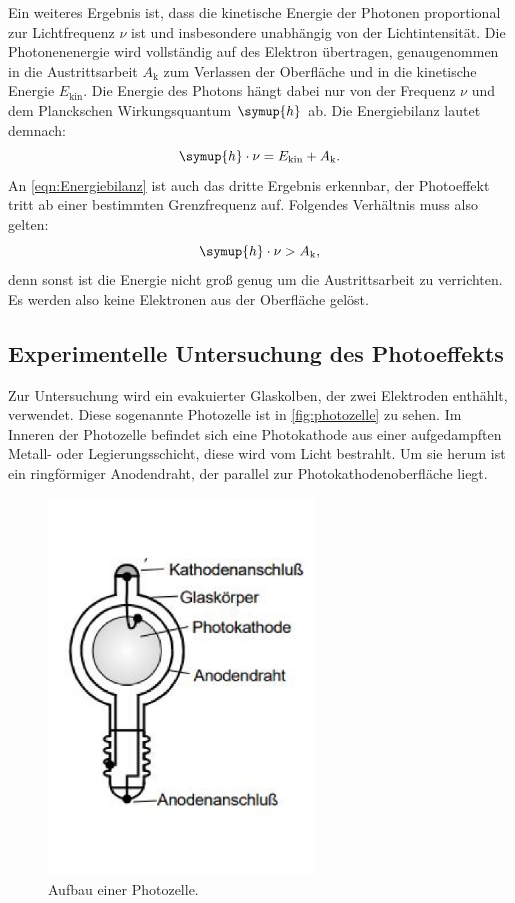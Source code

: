 \noindent
Ein weiteres Ergebnis ist, dass die kinetische Energie der Photonen proportional zur Lichtfrequenz $\nu$ ist und insbesondere unabhängig von der Lichtintensität.
Die Photonenenergie wird vollständig auf des Elektron übertragen, genaugenommen in die Austrittsarbeit $A_\text{k}$ zum Verlassen der Oberfläche und in die kinetische Energie $E_\text{kin}$.
Die Energie des Photons hängt dabei nur von der Frequenz $\nu$ und dem Planckschen Wirkungsquantum $\symup{h}$ ab.
Die Energiebilanz lautet demnach:
\begin{equation}
    \label{eqn:Energiebilanz}
    \symup{h} \cdot \nu = E_\text{kin} + A_\text{k}.
\end{equation}
An \autoref{eqn:Energiebilanz} ist auch das dritte Ergebnis erkennbar, der Photoeffekt tritt ab einer bestimmten Grenzfrequenz auf.
Folgendes Verhältnis muss also gelten:
\begin{equation*}
    \symup{h} \cdot \nu > A_\text{k},
\end{equation*}
denn sonst ist die Energie nicht groß genug um die Austrittsarbeit zu verrichten.
Es werden also keine Elektronen aus der Oberfläche gelöst.

\subsection{Experimentelle Untersuchung des Photoeffekts}
\label{subsec:Experimentelle Untersuchung des Photoeffekts mit der Gegenfeldmethode}

Zur Untersuchung wird ein evakuierter Glaskolben, der zwei Elektroden enthählt, verwendet.
Diese sogenannte Photozelle ist in \autoref{fig:photozelle} zu sehen.
Im Inneren der Photozelle befindet sich eine Photokathode aus einer aufgedampften Metall- oder Legierungsschicht, diese wird vom Licht bestrahlt.
Um sie herum ist ein ringförmiger Anodendraht, der parallel zur Photokathodenoberfläche liegt.

\begin{figure}
    \centering
    \includegraphics[height=10cm]{content/photozelle.pdf}
    \caption{Aufbau einer Photozelle.\cite{anleitung}}
    \label{fig:photozelle}
\end{figure}

